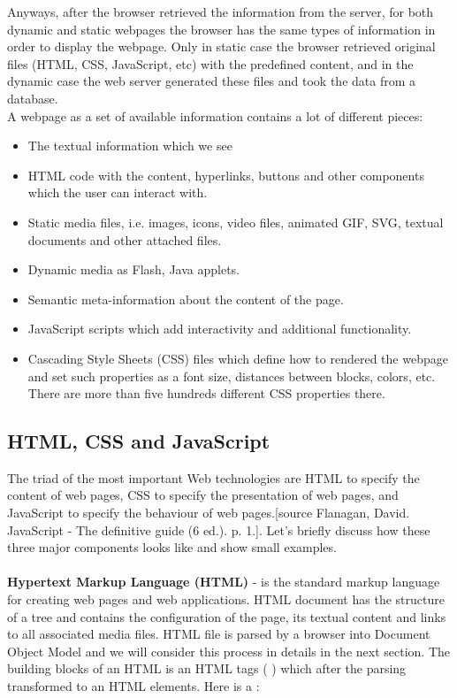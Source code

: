 Anyways, after the browser retrieved the information from the server, for both dynamic and static webpages the browser has the same types of information in order to display the webpage. Only in static case the browser retrieved original files (HTML, CSS, JavaScript, etc)  with the predefined content, and in the dynamic case the web server generated these files and took the data from a database.\\

A webpage as a set of available information contains a lot of different pieces:

\begin{itemize}
    \item The textual information which we see
    \item HTML code with the content, hyperlinks, buttons and other components which the user can interact with.
    \item Static media files, i.e. images, icons, video files, animated GIF, SVG, textual documents and other attached files.
    \item Dynamic media as Flash, Java applets.
    \item Semantic meta-information about the content of the page.
    \item JavaScript scripts which add interactivity and additional functionality.
    \item Cascading Style Sheets (CSS) files which define how to rendered the webpage and set such properties as a font size, distances between blocks, colors, etc. There are more than five hundreds different CSS properties there.
\end{itemize}

\subsection{HTML, CSS and JavaScript}
The triad of the most important Web technologies are HTML to specify the content of web pages, CSS to specify the presentation of web pages, and JavaScript to specify the behaviour of web pages.[source Flanagan, David. JavaScript - The definitive guide (6 ed.). p. 1.]. Let's briefly discuss how these three major components looks like and show small examples.\\
[source https://www.w3schools.com]\\

\noindent\textbf{Hypertext Markup Language (HTML)} - is the standard markup language for creating web pages and web applications. HTML document has the structure of a tree and contains the configuration of the page, its textual content and links to all associated media files. HTML file is parsed by a browser into Document Object Model and we will consider this process in details in the next section. The building blocks of an HTML is an HTML tags ( )  which after the parsing transformed to an HTML elements. Here is a : \\

